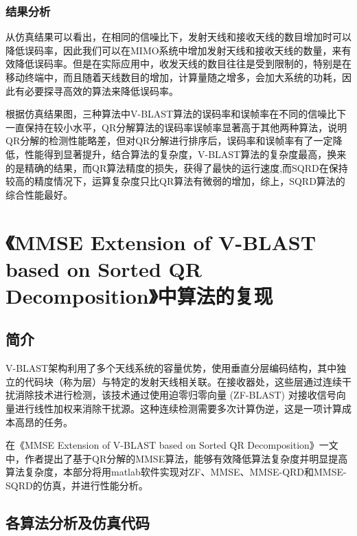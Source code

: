 \documentclass[a4paper,12pt]{article}
\begin{document}
	\subsubsection{结果分析}
	从仿真结果可以看出，在相同的信噪比下，发射天线和接收天线的数目增加时可以降低误码率，因此我们可以在MIMO系统中增加发射天线和接收天线的数量，来有效降低误码率。但是在实际应用中，收发天线的数目往往是受到限制的，特别是在移动终端中，而且随着天线数目的增加，计算量随之增多，会加大系统的功耗，因此有必要探寻高效的算法来降低误码率。\par 
	根据仿真结果图，三种算法中V-BLAST算法的误码率和误帧率在不同的信噪比下一直保持在较小水平，QR分解算法的误码率误帧率显著高于其他两种算法，说明QR分解的检测性能略差，但对QR分解进行排序后，误码率和误帧率有了一定降低，性能得到显著提升，结合算法的复杂度，V-BLAST算法的复杂度最高，换来的是精确的结果，而QR算法精度的损失，获得了最快的运行速度,而SQRD在保持较高的精度情况下，运算复杂度只比QR算法有微弱的增加，综上，SQRD算法的综合性能最好。
	\newpage
	\section{《MMSE Extension of V-BLAST based on Sorted QR Decomposition》中算法的复现}
	\subsection{简介}
	V-BLAST架构利用了多个天线系统的容量优势，使用垂直分层编码结构，其中独立的代码块（称为层）与特定的发射天线相关联。在接收器处，这些层通过连续干扰消除技术进行检测，该技术通过使用迫零归零向量 (ZF-BLAST) 对接收信号向量进行线性加权来消除干扰源。这种连续检测需要多次计算伪逆，这是一项计算成本高昂的任务。\par 
	在《MMSE Extension of V-BLAST based on
	Sorted QR Decomposition》一文中，作者提出了基于QR分解的MMSE算法，能够有效降低算法复杂度并明显提高算法复杂度，本部分将用matlab软件实现对ZF、MMSE、MMSE-QRD和MMSE-SQRD的仿真，并进行性能分析。
	\subsection{各算法分析及仿真代码}
\end{document}
